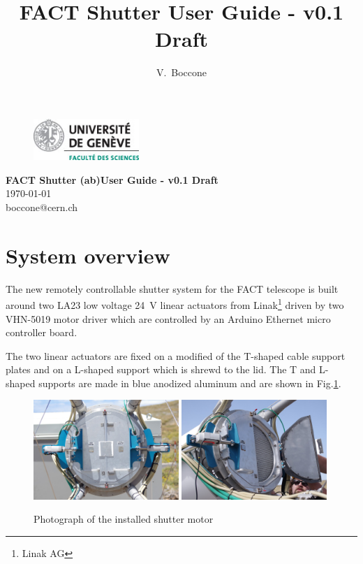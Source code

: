 \documentclass[12pt,a4,twoside]{article}
\def\version{v0.1 Draft}
\begin{document}
 
\title{FACT Shutter User Guide - \version}
\author{V.~Boccone} %
\maketitle 
\vspace*{-54mm}
\begin{figure}[h]
\includegraphics[width=40mm]{unigeLogo.jpg}
\end{figure}
\vspace*{-28mm}
{\flushright 
\hfill{\bf FACT Shutter (ab)User Guide - \version}\\
\hfill{\today}\\
\hfill{boccone@cern.ch}}
\vspace*{40 mm}

\section{\label{sec:1} System overview}
The new remotely controllable shutter system for the FACT telescope is built around two LA23 low voltage 24~V linear actuators from Linak\footnote{Linak AG} driven by two VHN-5019 motor driver which are controlled by an Arduino Ethernet micro controller board.

The two linear actuators are fixed on a modified of the T-shaped cable support plates and on a L-shaped support which is shrewd to the lid. The T and L-shaped supports are made in blue anodized aluminum and are shown in Fig.\ref{figShutterPhoto}.

\begin{figure}[b!]
\centering
\includegraphics[width=0.49\textwidth]{shutter_photo1.jpg}
\includegraphics[width=0.49\textwidth]{shutter_photo2.jpg}
\caption{\label{figShutterPhoto} {Photograph of the installed shutter motor}}
\end{figure}
\end{document}
